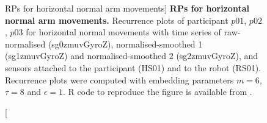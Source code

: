\begin{figure}
\caption
	[RPs for horizontal normal arm movements]{
	{\bf RPs for horizontal normal arm movements.}	
	Recurrence plots %
	of participant $p01$, $p02$, $p03$ for horizontal normal 
	movements with time series of raw-normalised (sg0zmuvGyroZ), 
	normalised-smoothed 1 (sg1zmuvGyroZ) and 
	normalised-smoothed 2 (sg2zmuvGyroZ), and 
	sensors attached to the participant (HS01) and to the robot (RS01).
	Recurrence plots were computed with 
	embedding parameters $m=6$, $\tau=8$ and $\epsilon=1$.
	R code to reproduce the figure is available from \cite{hwum2018}.
        }
    \label{fig:rp_HN}
\end{figure}



